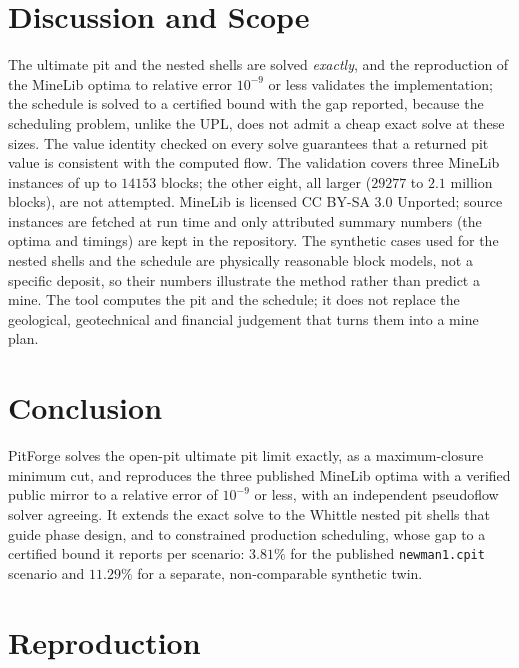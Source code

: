 \documentclass[journal]{IEEEtran}
\begin{document}
\section{Discussion and Scope}\label{sec:discuss}

The ultimate pit and the nested shells are solved \emph{exactly}, and the reproduction of the MineLib optima to
relative error $10^{-9}$ or less validates the implementation; the schedule is solved to a certified bound with the
gap reported, because the scheduling problem, unlike the UPL, does not admit a cheap exact solve at these sizes. The
value identity checked on every solve guarantees that a returned pit value is consistent with the computed flow.
The validation covers three MineLib instances of up to $14153$ blocks; the other eight, all larger ($29277$ to
$2.1$ million blocks), are not attempted. MineLib is licensed CC BY-SA 3.0 Unported; source instances are fetched at run time
and only attributed summary numbers (the optima and timings) are kept in the repository. The synthetic cases used
for the nested shells and the schedule are physically reasonable block models, not a specific deposit, so their
numbers illustrate the method rather than predict a mine. The tool computes the pit and the schedule; it does not
replace the geological, geotechnical and financial judgement that turns them into a mine plan.

\section{Conclusion}

PitForge solves the open-pit ultimate pit limit exactly, as a maximum-closure minimum cut, and reproduces the three
published MineLib optima with a verified public mirror to a relative error of $10^{-9}$ or less, with an independent
pseudoflow solver agreeing. It extends the exact solve to the Whittle nested pit shells that guide phase design, and
to constrained production scheduling, whose gap to a certified bound it reports per scenario: $3.81\%$ for the
published \texttt{newman1.cpit} scenario and $11.29\%$ for a separate, non-comparable synthetic twin.

\appendices
\section{Reproduction}\label{app:repro}
\end{document}
